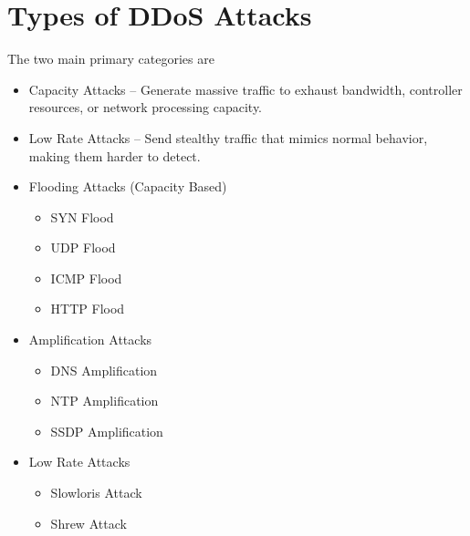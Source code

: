 \documentclass[12pt,a4paper]{article}
\begin{document}
\section{Types of DDoS Attacks}
The two main primary categories are
\begin{itemize}
  \item Capacity Attacks -- Generate massive traffic to exhaust bandwidth,
  controller resources, or network processing capacity.
  \item Low Rate Attacks -- Send stealthy traffic that mimics normal behavior,
  making them harder to detect.
  \item Flooding Attacks (Capacity Based)
  \begin{itemize}
    \item SYN Flood
    \item UDP Flood
    \item ICMP Flood
    \item HTTP Flood
  \end{itemize}
  \item Amplification Attacks
  \begin{itemize}
    \item DNS Amplification
    \item NTP Amplification
    \item SSDP Amplification
  \end{itemize}
  \item Low Rate Attacks
  \begin{itemize}
    \item Slowloris Attack
    \item Shrew Attack
  \end{itemize}
\end{itemize}

\newpage
\end{document}
